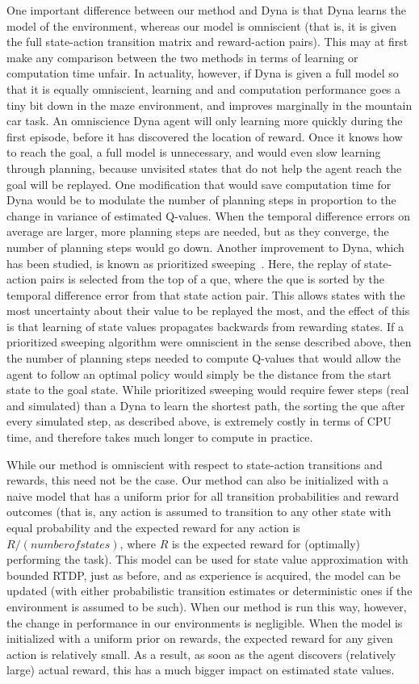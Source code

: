 \documentclass[letterpaper]{article}
\begin{document}
One important difference between our method and Dyna is that Dyna learns the model of the environment, whereas our model is omniscient (that is, it is given the full state-action transition matrix and reward-action pairs). This may at first make any comparison between the two methods in terms of learning or computation time unfair. In actuality, however, if Dyna is given a full model so that it is equally omniscient, learning and and computation performance goes a tiny bit down in the maze environment, and improves marginally in the mountain car task. An omniscience Dyna agent will only learning more quickly during the first episode, before it has discovered the location of reward. Once it knows how to reach the goal, a full model is unnecessary, and would even slow learning through planning, because unvisited states that do not help the agent reach the goal will be replayed. One modification that would save computation time for Dyna would be to modulate the number of planning steps in proportion to the change in variance of estimated Q-values. When the temporal difference errors on average are larger, more planning steps are needed, but as they converge, the number of planning steps would go down. Another improvement to Dyna, which has been studied, is known as prioritized sweeping~\cite{moore1993prioritized}. Here, the replay of state-action pairs is selected from the top of a que, where the que is sorted by the temporal difference error from that state action pair. This allows states with the most uncertainty about their value to be replayed the most, and the effect of this is that learning of state values propagates backwards from rewarding states. If a prioritized sweeping algorithm were omniscient in the sense described above, then the number of planning steps needed to compute Q-values that would allow the agent to follow an optimal policy would simply be the distance from the start state to the goal state. While prioritized sweeping would require fewer steps (real and simulated) than a Dyna to learn the shortest path, the sorting the que after every simulated step, as described above, is extremely costly in terms of CPU time, and therefore takes much longer to compute in practice.

While our method is omniscient with respect to state-action transitions and rewards, this need not be the case. Our method can also be initialized with a naive model that has a uniform prior for all transition probabilities and reward outcomes (that is, any action is assumed to transition to any other state with equal probability and the expected reward for any action is $R/(number of states)$, where $R$ is the expected reward for (optimally) performing the task). This model can be used for state value approximation with bounded RTDP, just as before, and as experience is acquired, the model can be updated (with either probabilistic transition estimates or deterministic ones if the environment is assumed to be such). When our method is run this way, however, the change in performance in our environments is negligible. When the model is initialized with a uniform prior on rewards, the expected reward for any given action is relatively small. As a result, as soon as the agent discovers (relatively large) actual reward, this has a much bigger impact on estimated state values.
\end{document}
